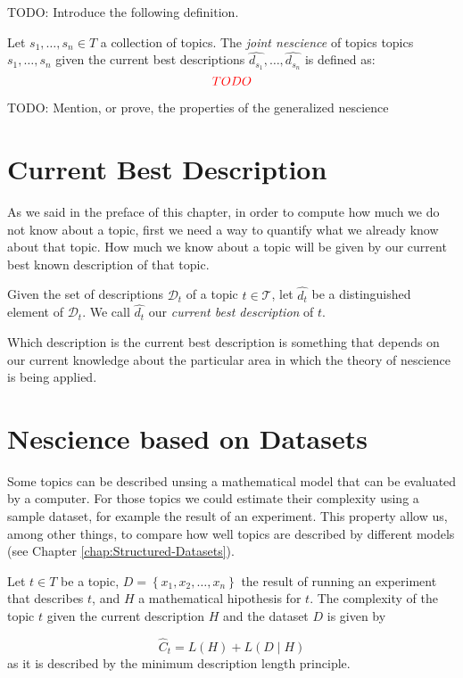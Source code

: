 {\color{red} TODO: Introduce the following definition.}

\begin{definition}
Let $s_{1}, \ldots, s_{n} \in T$ a collection of topics. The \emph{joint nescience} of topics topics $s_{1}, \ldots, s_{n}$ given the current best descriptions $\hat{d_{s_1}}, \ldots, \hat{d_{s_n}}$ is defined as: 
\[
{\color{red} TODO}
\]
\end{definition}

{\color{red} TODO: Mention, or prove, the properties of the generalized nescience}

%
%

\section{Current Best Description}

As we said in the preface of this chapter, in order to compute how much we do not know about a topic, first we need a way to quantify what we already know about that topic. How much we know about a topic will be given by our current best known description of that topic.

\begin{definition}
Given the set of descriptions $\mathcal{D}_t$ of a topic $t \in \mathcal{T}$, let $\hat{d_{t}}$ be a distinguished element of $\mathcal{D}_t$. We call $\hat{d_{t}}$ our \emph{current best description} of $t$.
\end{definition}

Which description is the current best description is something that depends on our current knowledge about the particular area in which the theory of nescience is being applied.


%
%

\section{Nescience based on Datasets}
\label{sec:nescience_datasets}

Some topics can be described unsing a mathematical model that can
be evaluated by a computer. For those topics we could estimate their
complexity using a sample dataset, for example the result of an experiment.
This property allow us, among other things, to compare how well topics
are described by different models (see Chapter \ref{chap:Structured-Datasets}).

\begin{definition}
Let $t\in T$ be a topic, $D=\left\{ x_{1},x_{2},\ldots,x_{n}\right\} $
the result of running an experiment that describes $t$, and $H$
a mathematical hipothesis for $t$. The complexity of the topic $t$
given the current description $H$ and the dataset $D$ is given by

\[
\hat{C}_{t}=L(H)+L(D\mid H)
\]
as it is described by the minimum description length principle.
\end{definition}

